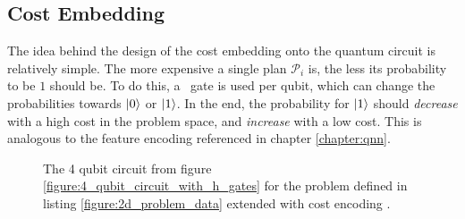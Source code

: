 \subsection{Cost Embedding}
\label{chapter:cost_embedding}

The idea behind the design of the cost embedding onto the quantum circuit is relatively simple. The more expensive a single plan $\mathcal{P}_i$ is, the less its probability to be $1$ should be. To do this, a \rygate\ gate is used per qubit, which can change the probabilities towards $\ket{0}$ or $\ket{1}$. In the end, the probability for $\ket{1}$ should \emph{decrease} with a high cost in the problem space, and \emph{increase} with a low cost. This is analogous to the feature encoding referenced in chapter \ref{chapter:qnn}.

\newpage

\begin{figure}[!h]
    \centering
    \caption{The 4 qubit circuit from figure \ref{figure:4_qubit_circuit_with_h_gates} for the problem defined in listing \ref{figure:2d_problem_data} extended with cost encoding \rygate.}
    \label{figure:4_qubit_circuit_with_h_ry_gates}
\end{figure}

